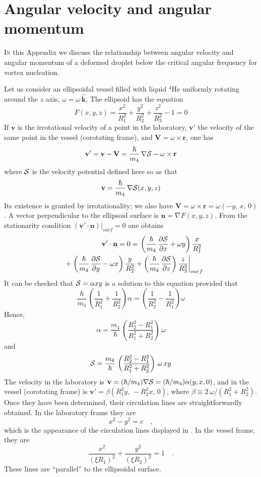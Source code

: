 \chapter{Angular velocity and angular momentum}

\lettrine[lines=3]{\color{activeColor}I}{n} this Appendix we discuss the relationship between angular velocity and angular momentum of a deformed droplet below the critical angular frequency for vortex 
nucleation.

Let us consider an ellipsoidal vessel filled with liquid $^4$He uniformly rotating around the $z$ axis, $\omega = \omega\, \hat{\mathbf{k}}$.
The ellipsoid has the equation
$$ F(x,y,z) =\frac{x^2}{R_1^2}+ \frac{y^2}{R_2^2}+  \frac{z^2}{R_3^2} - 1 = 0$$
%
If $\mathbf{v}$ is the  irrotational velocity of a point in the laboratory, $\mathbf{v}'$ the velocity of the same point in the vessel (corotating frame),  and 
$\mathbf{V}= \omega \times \mathbf{r}$, one has
%
$$\mathbf{v}'=  \mathbf{v} - \mathbf{V} = \frac{\hbar}{m_4} \, \nabla {\cal S} - \omega \times \mathbf{r}$$
%
where ${\cal S}$ is the velocity potential defined here so as  that 
%
$$\mathbf{v}= \frac{\hbar}{m_4} \, \nabla {\cal S}(x,y,z)$$
%
Its existence is granted by irrotationality;  we also have
  $\mathbf{V}= \omega \times \mathbf{r} = \omega (-y,\, x, \,0)$.
A vector  perpendicular to the ellipsoid  surface is 
%
$\mathbf{n} = \nabla  F(x,y,z)$.
%
From the stationarity condition 
%
$( \mathbf{v}'  \cdot  \mathbf{n})|_{surf} =0$
%
one obtains
%
\begin{eqnarray}
&&\mathbf{v}'  \cdot  \mathbf{n}= 0 = \left.\left(\frac{\hbar}{m_4} \, \frac{\partial {\cal S}}{\partial x} + \omega y\right) \frac{x}{R_1^2} \right.
\nonumber
\\
\nonumber
&&
+  \left. \left(\frac{\hbar}{m_4} \,\frac{\partial {\cal S}}{\partial y} - \omega x\right) \frac{y}{R_2^2} 
+  \left(\frac{\hbar}{m_4} \, \frac{\partial {\cal S}}{\partial z} \right) \frac{z}{R_3^2} \right|_{surf}
\end{eqnarray}
%
It can be checked that ${\cal S} = \alpha xy$ is a solution to this equation provided that
%
$$\frac{\hbar}{m_4} \,  \left( \frac{1}{R_1^2}  + \frac{1}{R_2^2} \right)  \alpha = \left(\frac{1}{R_2^2}  - \frac{1}{R_1^2} \right)  \omega$$
%
Hence,
%
$$ \alpha = \frac{m_4}{\hbar}\,\left( \frac{R_2^2-R_1^2}{R_1^2+R_2^2}\right) \, \omega$$
%
and
%
$$ {\cal S} = \frac{m_4}{\hbar} \, \left( \frac{R_2^2-R_1^2}{R_1^2+R_2^2}\right)  \, \omega \, xy$$
%
The velocity in the laboratory is 
$ \mathbf{v} = (\hbar/m_4)\nabla {\cal S}=  (\hbar/m_4)\alpha (y, x, 0) $,
and in the vessel (corotating frame) is
$\mathbf{v}'= \beta (R_1^2 y, \, -R_2 ^2 x, \,0) $, where $\beta \equiv  2 \, \omega/(R_1^2+R_2^2)$.
 Once they have been determined, their  circulation lines are straightforwardly obtained. 
In the laboratory frame they are
$$ x^2 - y^2 = c \quad ,$$
%
which is the appearance of the circulation lines displayed in . In the vessel  frame, they are
%
$$ \frac{x^2}{(\xi R_1)^2}+ \frac{ y^2}{(\xi R_2)^2} = 1 \quad .$$ 
%
These lines are ``parallel'' to the ellipsoidal surface.

